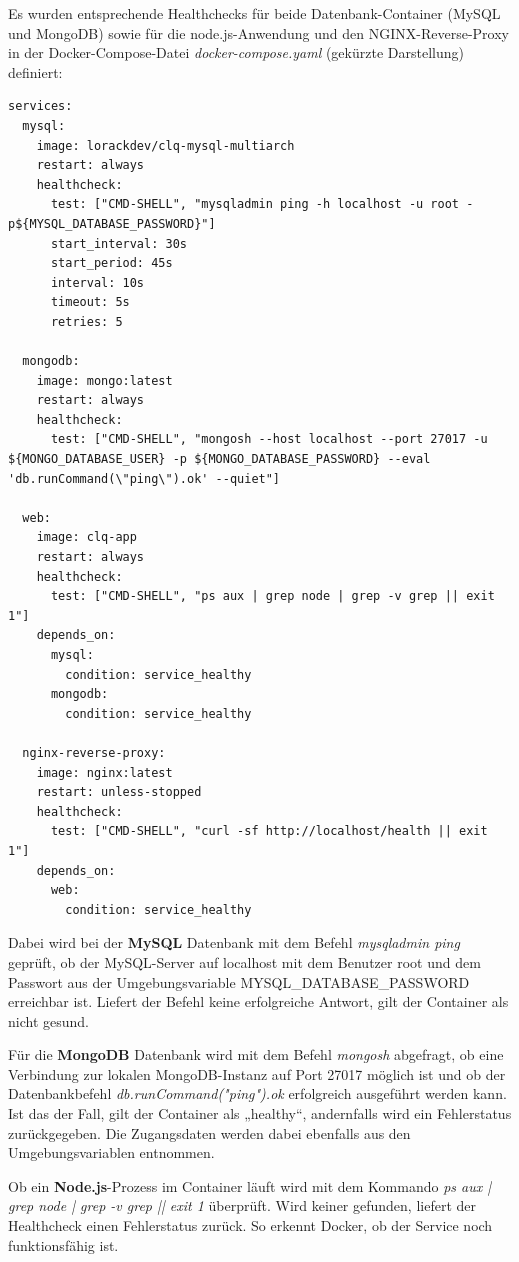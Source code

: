 Es wurden entsprechende Healthchecks für beide Datenbank-Container (MySQL und MongoDB) sowie für die node.js-Anwendung und den NGINX-Reverse-Proxy in der Docker-Compose-Datei \textit{docker-compose.yaml} (gekürzte Darstellung) definiert:
\vspace{1em}
\begin{lstlisting}[label={lst:lst-dockercompose-container-healthchecks}, caption=Healthchecks in der Docker-Compose-Datei]
services:
  mysql:
    image: lorackdev/clq-mysql-multiarch
    restart: always
    healthcheck:
      test: ["CMD-SHELL", "mysqladmin ping -h localhost -u root -p${MYSQL_DATABASE_PASSWORD}"]
      start_interval: 30s
      start_period: 45s
      interval: 10s
      timeout: 5s
      retries: 5

  mongodb:
    image: mongo:latest
    restart: always
    healthcheck:
      test: ["CMD-SHELL", "mongosh --host localhost --port 27017 -u ${MONGO_DATABASE_USER} -p ${MONGO_DATABASE_PASSWORD} --eval 'db.runCommand(\"ping\").ok' --quiet"]

  web:
    image: clq-app
    restart: always
    healthcheck:
      test: ["CMD-SHELL", "ps aux | grep node | grep -v grep || exit 1"]
    depends_on:
      mysql:
        condition: service_healthy
      mongodb:
        condition: service_healthy

  nginx-reverse-proxy:
    image: nginx:latest
    restart: unless-stopped
    healthcheck:
      test: ["CMD-SHELL", "curl -sf http://localhost/health || exit 1"]
    depends_on:
      web:
        condition: service_healthy
\end{lstlisting}
\vspace{1em}

Dabei wird bei der \textbf{MySQL} Datenbank mit dem Befehl \textit{mysqladmin ping} geprüft, ob der MySQL-Server auf localhost mit dem Benutzer root und dem Passwort aus der Umgebungsvariable MYSQL\_DATABASE\_PASSWORD erreichbar ist.
Liefert der Befehl keine erfolgreiche Antwort, gilt der Container als nicht gesund.

Für die \textbf{MongoDB} Datenbank wird mit dem Befehl \textit{mongosh} abgefragt, ob eine Verbindung zur lokalen MongoDB-Instanz auf Port 27017 möglich ist und ob der Datenbankbefehl \textit{db.runCommand("ping").ok} erfolgreich ausgeführt werden kann.
Ist das der Fall, gilt der Container als „healthy“, andernfalls wird ein Fehlerstatus zurückgegeben.
Die Zugangsdaten werden dabei ebenfalls aus den Umgebungsvariablen entnommen.

Ob ein \textbf{Node.js}-Prozess im Container läuft wird mit dem Kommando \textit{ps aux | grep node | grep -v grep || exit 1} überprüft.
Wird keiner gefunden, liefert der Healthcheck einen Fehlerstatus zurück.
So erkennt Docker, ob der Service noch funktionsfähig ist.

